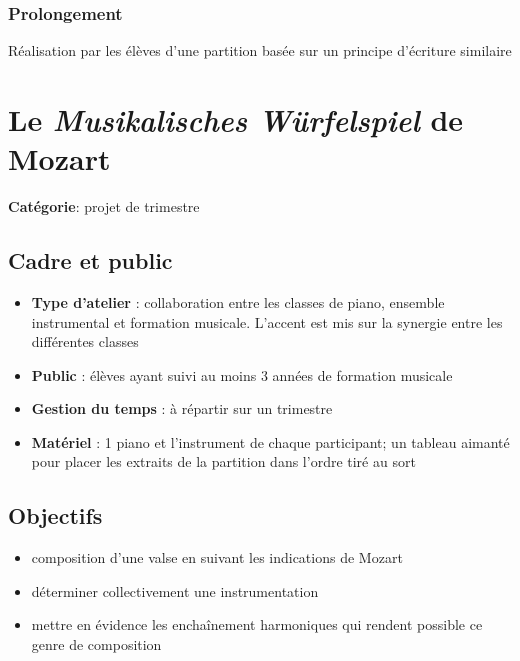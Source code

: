 \documentclass[a4paper,11pt,bibliography=totoc,numbers=noenddot,listof=flat,DIV=11,BCOR=0mm]{scrreprt}%
\begin{document}
\subsection*{Prolongement}
Réalisation par les élèves d’une partition basée sur un principe d’écriture similaire


\chapter[Projet de trimestre: Le \emph{Musikalisches Würfelspiel} de Mozart]{Le \emph{Musikalisches Würfelspiel} de Mozart}


{\large \textbf{Catégorie}}:
projet de trimestre

\section*{Cadre et public}
\begin{itemize}
\item [\textbullet]\textbf{Type d'atelier} : collaboration entre les classes de piano, ensemble instrumental et formation musicale. L'accent est mis sur la synergie entre les différentes classes

\item [\textbullet]\textbf{Public} : élèves ayant suivi au moins 3 années de formation musicale

\item [\textbullet]\textbf{Gestion du temps} : à répartir sur un trimestre

\item [\textbullet]\textbf{Matériel} : 1 piano et l'instrument de chaque participant; un tableau aimanté pour placer les extraits de la partition dans l'ordre tiré au sort
\end{itemize}

\section*{Objectifs}
\begin{itemize}
\item composition d'une valse en suivant les indications de Mozart
\item déterminer collectivement une instrumentation
\item mettre en évidence les enchaînement harmoniques qui rendent possible ce genre de composition
\end{itemize}
\end{document}
